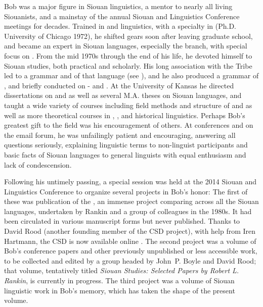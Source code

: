 \begin{refsection}
Bob was a major figure in Siouan linguistics, a mentor to nearly all living Siouanists, and a mainstay of the annual Siouan and  Linguistics Conference meetings for decades. Trained in  and  linguistics, with a specialty in  (Ph.D. University of Chicago 1972), he shifted gears soon after leaving graduate school, and became an expert in Siouan languages, especially the  branch, with special focus on . From the mid 1970s through the end of his life, he devoted himself to Siouan studies, both practical and scholarly. His long association with the  Tribe led to a grammar and  of that language (see \citealt{Cumberland2016}), and he also produced a grammar of , and briefly conducted  on - and . At the University of Kansas he directed dissertations on  \citep{Trechter1995} and  \citep{Oliverio1996} as well as several M.A. theses on Siouan languages, and taught a wide variety of courses including field methods and structure of  and  as well as more theoretical courses in , , and historical linguistics. Perhaps Bob's greatest gift to the field was his encouragement of others. At conferences and on the  email forum, he was unfailingly patient and encouraging, answering all questions seriously, explaining linguistic terms to non-linguist participants and basic facts of Siouan languages to general linguists with equal enthusiasm and lack of condescension.

Following his untimely passing, a special session was held at the 2014 Siouan and  Linguistics Conference to organize several projects in Bob's honor: The first of these was publication of the , an immense project comparing  across all the Siouan languages, undertaken by Rankin and a group of colleagues in the 1980s. It had been circulated in various manuscript forms but never published. Thanks to David Rood (another founding member of the CSD project), with help from Iren Hartmann, the CSD is now available online \citep{RankinEtAl2015AccessSeptember}. The second project was a volume of Bob's conference papers and other previously unpublished or less accessible work, to be collected and edited by a group headed by John~P. Boyle and David Rood; that volume, tentatively titled \textit{Siouan Studies: Selected Papers by Robert L. Rankin}, is currently in progress. The third project was a volume of Siouan linguistic work in Bob's memory, which has taken the shape of the present volume.

\printbibliography[heading=subbibliography,notkeyword=this]

%

\end{refsection}

